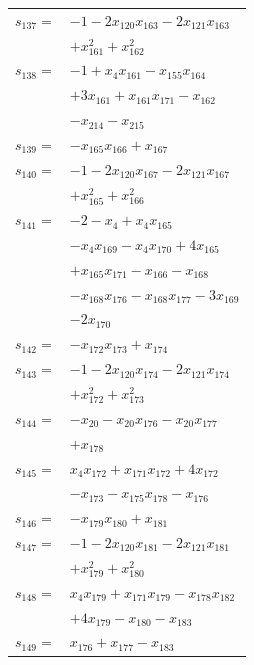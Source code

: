 \begin{longtable}{@{}r@{\;}l@{}}
\(s_{137}=\) & \(\displaystyle -1 -2x_{120}x_{163} -2x_{121}x_{163}\) \\
 & \(\displaystyle +x_{161}^{2} +x_{162}^{2}\) \\[3pt]
\(s_{138}=\) & \(\displaystyle -1 +x_{4}x_{161} -x_{155}x_{164}\) \\
 & \(\displaystyle +3x_{161} +x_{161}x_{171} -x_{162}\) \\
 & \(\displaystyle -x_{214} -x_{215}\) \\[3pt]
\(s_{139}=\) & \(\displaystyle -x_{165}x_{166} +x_{167}\) \\[3pt]
\(s_{140}=\) & \(\displaystyle -1 -2x_{120}x_{167} -2x_{121}x_{167}\) \\
 & \(\displaystyle +x_{165}^{2} +x_{166}^{2}\) \\[3pt]
\(s_{141}=\) & \(\displaystyle -2 -x_{4} +x_{4}x_{165}\) \\
 & \(\displaystyle -x_{4}x_{169} -x_{4}x_{170} +4x_{165}\) \\
 & \(\displaystyle +x_{165}x_{171} -x_{166} -x_{168}\) \\
 & \(\displaystyle -x_{168}x_{176} -x_{168}x_{177} -3x_{169}\) \\
 & \(\displaystyle -2x_{170}\) \\[3pt]
\(s_{142}=\) & \(\displaystyle -x_{172}x_{173} +x_{174}\) \\[3pt]
\(s_{143}=\) & \(\displaystyle -1 -2x_{120}x_{174} -2x_{121}x_{174}\) \\
 & \(\displaystyle +x_{172}^{2} +x_{173}^{2}\) \\[3pt]
\(s_{144}=\) & \(\displaystyle -x_{20} -x_{20}x_{176} -x_{20}x_{177}\) \\
 & \(\displaystyle +x_{178}\) \\[3pt]
\(s_{145}=\) & \(\displaystyle x_{4}x_{172} +x_{171}x_{172} +4x_{172}\) \\
 & \(\displaystyle -x_{173} -x_{175}x_{178} -x_{176}\) \\[3pt]
\(s_{146}=\) & \(\displaystyle -x_{179}x_{180} +x_{181}\) \\[3pt]
\(s_{147}=\) & \(\displaystyle -1 -2x_{120}x_{181} -2x_{121}x_{181}\) \\
 & \(\displaystyle +x_{179}^{2} +x_{180}^{2}\) \\[3pt]
\(s_{148}=\) & \(\displaystyle x_{4}x_{179} +x_{171}x_{179} -x_{178}x_{182}\) \\
 & \(\displaystyle +4x_{179} -x_{180} -x_{183}\) \\[3pt]
\(s_{149}=\) & \(\displaystyle x_{176} +x_{177} -x_{183}\) \\

\end{longtable}
